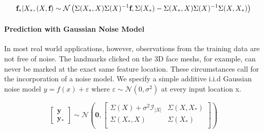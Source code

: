 \begin{equation}
    \textbf{f}_{*}\vert X_{*},(X,\textbf{f}) \sim \mathcal{N}\left(\Sigma(X_{*},X)\Sigma(X)^{-1}\textbf{f},\\\Sigma(X_{*})-\Sigma(X_{*},X)\Sigma(X)^{-1}\Sigma(X,X_{*})\right)
\end{equation}

\paragraph{Prediction with Gaussian Noise Model}
In most real world applications, however, observations from the training data are not free of noise. The landmarks clicked on the 3D face meshs, for example, can never be marked at the exact same feature location. These circumstances call for the incorporation of a noise model. We specify a simple additive i.i.d Gaussian noise model $y = f(x) + \varepsilon$ where $\varepsilon \sim \mathcal{N}(0, \sigma^2)$ at every input location x. 

\begin{equation}
\begin{bmatrix}\textbf{y}\\\textbf{y}_{*}\end{bmatrix}
\sim \mathcal{N}\left(\textbf{0},
\begin{bmatrix}
    \Sigma(X) + \sigma^2\mathcal{I}_{\left|X \right|} & \Sigma(X,X_{*})\\
    \Sigma(X_{*},X) & \Sigma(X_{*})\\
\end{bmatrix}
\right)
\end{equation}

